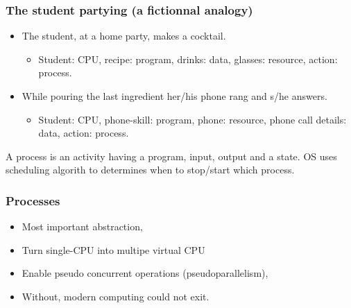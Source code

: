   \begin{frame}
    \frametitle{The student partying (a fictionnal analogy)}
        \begin{itemize}
          \item The student, at a home party, makes a cocktail.
          \begin{itemize}
            \item Student: CPU, recipe: program, drinks: data, glasses: resource, action: process.
          \end{itemize}
          \item While pouring the last ingredient her/his phone rang and s/he answers.
          \begin{itemize}
            \item Student: CPU, phone-skill: program, phone: resource, phone call details: data, action: process.
          \end{itemize}
        \end{itemize}
	A process is an activity having a program, input, output and a state. OS uses scheduling algorith to determines when to stop/start which process.
  \end{frame}

  \begin{frame}
    \frametitle{Processes}
        \begin{itemize}
          \item Most important abstraction,
          \item Turn single-CPU into multipe virtual CPU
          \item Enable pseudo concurrent operations (pseudoparallelism),
          \item Without, modern computing could not exit.
        \end{itemize}
  \end{frame}

